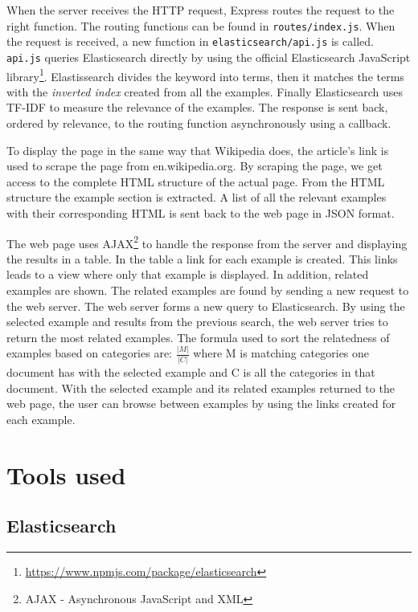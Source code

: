 When the server receives the HTTP request, Express routes the request to the right function. The routing functions can be found in \texttt{routes/index.js}. 
When the request is received, a new function in \texttt{elasticsearch/api.js} is called. \texttt{api.js} queries Elasticsearch directly by using the official Elasticsearch JavaScript  library\footnote{\url{https://www.npmjs.com/package/elasticsearch}}. Elastissearch divides the keyword into terms, then it matches the terms with the \textit{inverted index} created from all the examples. Finally Elasticsearch uses TF-IDF to measure the relevance of the examples. The response is sent back, ordered by relevance, to the routing function asynchronously using a callback.

To display the page in the same way that Wikipedia does, the article's link is used to scrape the page from en.wikipedia.org. By scraping the page, we get access to the complete HTML structure of the actual page. From the HTML structure the example section is extracted. A list of all the relevant examples with their corresponding HTML is sent back to the web page in JSON format. 

The web page uses AJAX\footnote{AJAX - Asynchronous JavaScript and XML} to handle the response from the server and displaying the results in a table. In the table a link for each example is created. This links leads to a view where only that example is displayed. In addition, related examples are shown. The related examples are found by sending a new request to the web server. The web server forms a new query to Elasticsearch. By using the selected example and results from the previous search, the web server tries to return the most related examples. The formula used to sort the relatedness of examples based on categories are: \(\frac{|M|}{|C|}\) where M is matching categories one document has with the selected example and C is all the categories in that document.
With the selected example and its related examples returned to the web page, the user can browse between examples by using the links created for each example.

\section{Tools used}

\subsection{Elasticsearch} \label{elasticsearch}

